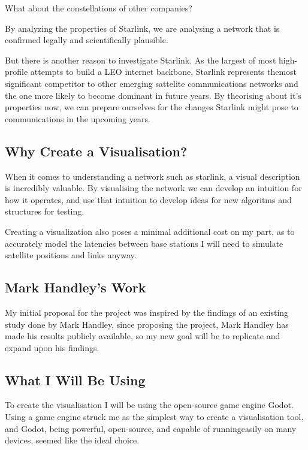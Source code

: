 \documentclass[12pt]{article}
\begin{document}
What about the constellations of other companies? %

By analyzing the properties of Starlink, we are analysing a network that is confirmed legally and scientifically plausible.

But there is another reason to investigate Starlink. As the largest of most high-profile attempts to build a LEO internet backbone, Starlink represents themost significant competitor to other emerging sattelite communications networks and the one more likely to become dominant in future years. By theorising about it's properties now, we can prepare ourselves for the changes Starlink might pose to communications in the upcoming years.

\subsection{Why Create a Visualisation?}
When it comes to understanding a network such as starlink, a visual description is incredibly valuable. By visualising the network we can develop an intuition for how it operates, and use that intuition to develop ideas for new algoritms and structures for testing.

Creating a visualization also poses a minimal additional cost on my part, as to accurately model the latencies between base stations I will need to simulate satellite positions and links anyway.

\subsection{Mark Handley's Work}


My initial proposal for the project was inspired by the findings of an existing study done  by Mark Handley, since proposing the project, Mark Handley has made his results publicly available\cite{OriginalReport}, so my new goal will be to replicate and expand upon his findings.

\subsection{What I Will Be Using}
To create the visualisation I will be using the open-source game engine Godot. Using a game engine struck me as the simplest way to create a visualisation tool, and Godot, being powerful, open-source, and capable of runningeasily on many devices, seemed like the ideal choice.
\end{document}
